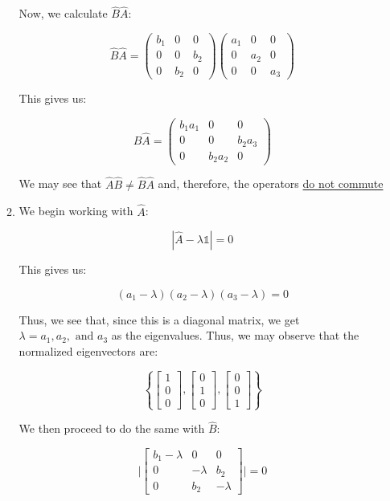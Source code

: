 \begin{enumerate}
\begin{enumerate}
        Now, we calculate $\hat{B}\hat{A}$:

        $$\hat{B}\hat{A}=\left( \begin{matrix} b_1 & 0 & 0\\ 0 & 0 & b_2\\ 0 & b_2 & 0\end{matrix} \right)\left( \begin{matrix} a_1 & 0 & 0\\ 0 & a_2 & 0\\ 0 & 0 & a_3\end{matrix} \right)$$

        This gives us:

        $$\hat{B}\hat{A}=\left( \begin{matrix} b_1a_1 & 0 & 0\\ 0 & 0 & b_2a_3\\ 0 & b_2a_2&0\end{matrix} \right)$$

        We may see that $\hat{A}\hat{B}\neq\hat{B}\hat{A}$ and, therefore, the operators \underline{do not commute}

      \item We begin working with $\hat{A}$:

        $$|\hat{A}-\lambda\mathbb{1}|=0$$

        This gives us:

        $$(a_1-\lambda)(a_2-\lambda)(a_3-\lambda)=0$$

        Thus, we see that, since this is a diagonal matrix, we get $\boxed{\lambda=a_1, a_2,\text{ and }a_3}$ as the eigenvalues. Thus, we may observe that the normalized eigenvectors are:

        $$\boxed{\left\{ \left[ \begin{matrix} 1\\0\\0\end{matrix} \right], \left[ \begin{matrix}0\\1\\0\end{matrix} \right],\left[ \begin{matrix} 0\\0\\1\end{matrix} \right] \right\}}$$

        We then proceed to do the same with $\hat{B}$:

        $$\Big|\left[ \begin{matrix} b_1-\lambda & 0 & 0\\ 0 & -\lambda & b_2\\0 & b_2 & -\lambda\end{matrix} \right]\Big|=0$$


\end{enumerate}
\end{enumerate}
